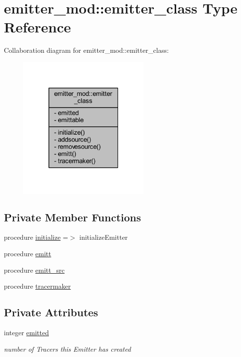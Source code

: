 \hypertarget{structemitter__mod_1_1emitter__class}{}\section{emitter\+\_\+mod\+:\+:emitter\+\_\+class Type Reference}
\label{structemitter__mod_1_1emitter__class}


Collaboration diagram for emitter\+\_\+mod\+:\+:emitter\+\_\+class\+:\nopagebreak
\begin{figure}[H]
\begin{center}
\leavevmode
\includegraphics[width=187pt]{structemitter__mod_1_1emitter__class__coll__graph}
\end{center}
\end{figure}
\subsection*{Private Member Functions}
\begin{DoxyCompactItemize}
\item 
procedure \mbox{\hyperlink{structemitter__mod_1_1emitter__class_acd215b2680677e298267c5940f0cf79b}{initialize}} =$>$ initialize\+Emitter
\item 
procedure \mbox{\hyperlink{structemitter__mod_1_1emitter__class_ac33721448c01508a8e8c486cd7a76b65}{emitt}}
\item 
procedure \mbox{\hyperlink{structemitter__mod_1_1emitter__class_add0931d8dbc76013de6ca81660639835}{emitt\+\_\+src}}
\item 
procedure \mbox{\hyperlink{structemitter__mod_1_1emitter__class_a35d90033d453c725390c4532cc8231f7}{tracermaker}}
\end{DoxyCompactItemize}
\subsection*{Private Attributes}
\begin{DoxyCompactItemize}
\item 
integer \mbox{\hyperlink{structemitter__mod_1_1emitter__class_aa8f56d34f32e452a2e78f93f44780b4b}{emitted}}
\begin{DoxyCompactList}\small\item\em number of Tracers this Emitter has created \end{DoxyCompactList}\end{DoxyCompactItemize}


